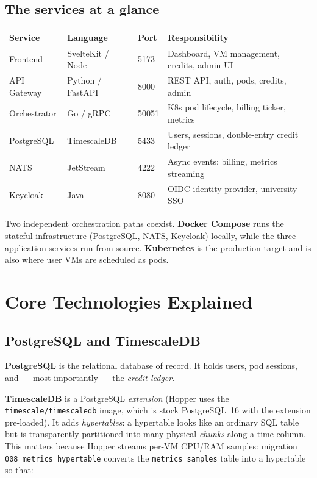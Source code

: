 \documentclass[11pt,a4paper]{article}
\newcommand{\code}[1]{\texttt{\small #1}}
\begin{document}
\subsection{The services at a glance}

\begin{center}
\begin{tabular}{@{}llll@{}}
\toprule
\textbf{Service} & \textbf{Language} & \textbf{Port} & \textbf{Responsibility} \\
\midrule
Frontend     & SvelteKit / Node & 5173 & Dashboard, VM management, credits, admin UI \\
API Gateway  & Python / FastAPI & 8000 & REST API, auth, pods, credits, admin \\
Orchestrator & Go / gRPC        & 50051 & K8s pod lifecycle, billing ticker, metrics \\
PostgreSQL   & TimescaleDB      & 5433 & Users, sessions, double-entry credit ledger \\
NATS         & JetStream        & 4222 & Async events: billing, metrics streaming \\
Keycloak     & Java             & 8080 & OIDC identity provider, university SSO \\
\bottomrule
\end{tabular}
\end{center}

\noindent
Two independent orchestration paths coexist. \textbf{Docker Compose} runs the
stateful infrastructure (PostgreSQL, NATS, Keycloak) locally, while the three
application services run from source. \textbf{Kubernetes} is the production target
and is also where user VMs are scheduled as pods.

\section{Core Technologies Explained}

\subsection{PostgreSQL and TimescaleDB}

\textbf{PostgreSQL} is the relational database of record. It holds users, pod
sessions, and --- most importantly --- the \emph{credit ledger}.

\textbf{TimescaleDB} is a PostgreSQL \emph{extension} (Hopper uses the
\code{timescale/timescaledb} image, which is stock PostgreSQL~16 with the
extension pre-loaded). It adds \emph{hypertables}: a hypertable looks like an
ordinary SQL table but is transparently partitioned into many physical
\emph{chunks} along a time column. This matters because Hopper streams
per-VM CPU/RAM samples: migration \code{008\_metrics\_hypertable} converts the
\code{metrics\_samples} table into a hypertable so that:
\end{document}
